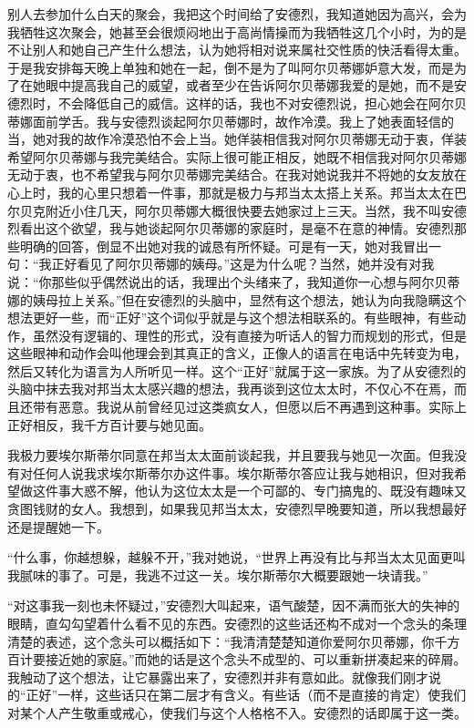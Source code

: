 \par 别人去参加什么白天的聚会，我把这个时间给了安德烈，我知道她因为高兴，会为我牺牲这次聚会，她甚至会很烦闷地出于高尚情操而为我牺牲这几个小时，为的是不让别人和她自己产生什么想法，认为她将相对说来属社交性质的快活看得太重。于是我安排每天晚上单独和她在一起，倒不是为了叫阿尔贝蒂娜妒意大发，而是为了在她眼中提高我自己的威望，或者至少在告诉阿尔贝蒂娜我爱的是她，而不是安德烈时，不会降低自己的威信。这样的话，我也不对安德烈说，担心她会在阿尔贝蒂娜面前学舌。我与安德烈谈起阿尔贝蒂娜时，故作冷漠。我上了她表面轻信的当，她对我的故作冷漠恐怕不会上当。她佯装相信我对阿尔贝蒂娜无动于衷，佯装希望阿尔贝蒂娜与我完美结合。实际上很可能正相反，她既不相信我对阿尔贝蒂娜无动于衷，也不希望我与阿尔贝蒂娜完美结合。在我对她说我并不将她的女友放在心上时，我的心里只想着一件事，那就是极力与邦当太太搭上关系。邦当太太在巴尔贝克附近小住几天，阿尔贝蒂娜大概很快要去她家过上三天。当然，我不叫安德烈看出这个欲望，我与她谈起阿尔贝蒂娜的家庭时，是毫不在意的神情。安德烈那些明确的回答，倒显不出她对我的诚恳有所怀疑。可是有一天，她对我冒出一句：“我正好看见了阿尔贝蒂娜的姨母。”这是为什么呢？当然，她并没有对我说：“你那些似乎偶然说出的话，我理出个头绪来了，我知道你一心想与阿尔贝蒂娜的姨母拉上关系。”但在安德烈的头脑中，显然有这个想法，她认为向我隐瞒这个想法更好一些，而“正好”这个词似乎就是与这个想法相联系的。有些眼神，有些动作，虽然没有逻辑的、理性的形式，没有直接为听话人的智力而规划的形式，但是这些眼神和动作会叫他理会到其真正的含义，正像人的语言在电话中先转变为电，然后又转化为语言为人所听见一样。这个“正好”就属于这一家族。为了从安德烈的头脑中抹去我对邦当太太感兴趣的想法，我再谈到这位太太时，不仅心不在焉，而且还带有恶意。我说从前曾经见过这类疯女人，但愿以后不再遇到这种事。实际上正好相反，我千方百计要与她见面。
\par 我极力要埃尔斯蒂尔同意在邦当太太面前谈起我，并且要我与她见一次面。但我没有对任何人说我求埃尔斯蒂尔办这件事。埃尔斯蒂尔答应让我与她相识，但对我希望做这件事大惑不解，他认为这位太太是一个可鄙的、专门搞鬼的、既没有趣味又贪图钱财的女人。我想到，如果我见邦当太太，安德烈早晚要知道，所以我想最好还是提醒她一下。
\par “什么事，你越想躲，越躲不开，”我对她说，“世界上再没有比与邦当太太见面更叫我腻味的事了。可是，我逃不过这一关。埃尔斯蒂尔大概要跟她一块请我。”
\par “对这事我一刻也未怀疑过，”安德烈大叫起来，语气酸楚，因不满而张大的失神的眼睛，直勾勾望着什么看不见的东西。安德烈的这些话还构不成对一个念头的条理清楚的表述，这个念头可以概括如下：“我清清楚楚知道你爱阿尔贝蒂娜，你千方百计要接近她的家庭。”而她的话是这个念头不成型的、可以重新拼凑起来的碎屑。我触动了这个想法，让它暴露出来了，安德烈并非有意如此。就像我们刚才说的“正好”一样，这些话只在第二层才有含义。有些话（而不是直接的肯定）使我们对某个人产生敬重或戒心，使我们与这个人格格不入。安德烈的话即属于这一类。
